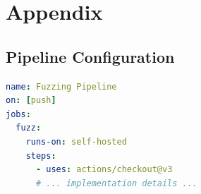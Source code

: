 






\appendix
\chapter{Appendix}
\section{Pipeline Configuration}
\begin{lstlisting}[language=yaml, caption={GitHub Actions Workflow Snippet}, label={lst:appendix_yml}]
name: Fuzzing Pipeline
on: [push]
jobs:
  fuzz:
    runs-on: self-hosted
    steps:
      - uses: actions/checkout@v3
      # ... implementation details ...
\end{lstlisting}

\cleardoublepage
{}
{}
\printbibliography[heading=bibintoc]

\cleardoublepage
 


